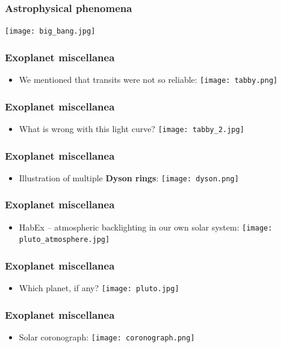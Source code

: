 \documentclass{beamer}
\begin{document}
\begin{frame}
  \center
  \frametitle{Astrophysical phenomena}
  \texttt{[image: big\_bang.jpg]}
\end{frame}

\begin{frame}
  \frametitle{Exoplanet miscellanea}
  \begin{itemize}
    \item We mentioned that transits were not so reliable:
      \texttt{[image: tabby.png]}
  \end{itemize}
\end{frame}

\begin{frame}
  \frametitle{Exoplanet miscellanea}
  \begin{itemize}
    \item What is wrong with this light curve?
      \texttt{[image: tabby\_2.jpg]}
  \end{itemize}
\end{frame}

\begin{frame}
  \frametitle{Exoplanet miscellanea}
  \begin{itemize}
    \item Illustration of multiple \textbf{Dyson rings}:
      \texttt{[image: dyson.png]}
  \end{itemize}
\end{frame}

\begin{frame}
  \frametitle{Exoplanet miscellanea}
  \begin{itemize}
    \item HabEx -- atmospheric backlighting in our own solar system:
      \texttt{[image: pluto\_atmosphere.jpg]}
  \end{itemize}
\end{frame}

\begin{frame}
  \frametitle{Exoplanet miscellanea}
  \begin{itemize}
    \item Which planet, if any?
      \texttt{[image: pluto.jpg]}
  \end{itemize}
\end{frame}

\begin{frame}
  \frametitle{Exoplanet miscellanea}
  \begin{itemize}
    \item Solar coronograph:
      \texttt{[image: coronograph.png]}
  \end{itemize}
\end{frame}
\end{document}
